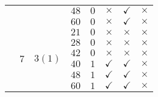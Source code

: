 \documentclass[12pt,a4paper,halfparskip,headsepline,bibtotocnumbered]{scrreprt}
\theoremstyle{nummermitklammern}
\theoremstyle{nonumberbreak}
\begin{document}
\begin{table}[H]
\begin{tabular}{|c|c|c|c|c|c|c|c|}
								&						&							&$48$	&$0$	&$\times$		&$\checkmark$	&$\times$\\ \cline{4-8}
								&						&							&$60$	&$0$	&$\times$		&$\checkmark$	&$\times$\\ \cline{2-8}
								&\multirow{6}{*}{$7$}	&\multirow{6}{*}{$3(1)$}	&$21$	&$0$	&$\times$		&$\times$		&$\times$\\ \cline{4-8}
								&						&							&$28$	&$0$	&$\times$		&$\times$		&$\times$\\ \cline{4-8}
								&						&							&$42$	&$0$	&$\times$		&$\times$		&$\times$\\ \cline{4-8}
								&						&							&$40$	&$1$	&$\checkmark$	&$\checkmark$	&$\times$\\ \cline{4-8}
								&						&							&$48$	&$1$	&$\checkmark$	&$\checkmark$	&$\times$\\ \cline{4-8}
								&						&							&$60$	&$1$	&$\checkmark$	&$\checkmark$	&$\times$\\ \hline
	\end{tabular}
\end{table}
\end{document}
